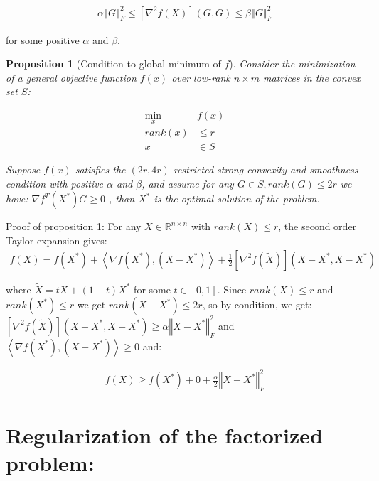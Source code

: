 \documentclass{article}
\newtheorem{proposition}{Proposition}
\begin{document}
\begin{align}
\alpha\left\Vert G\right\Vert^2_F\le \left[\nabla^2f\left(X\right)\right]\left(G,G\right)\le \beta\left\Vert G\right\Vert^2_F
\end{align}

for some positive $\alpha$ and $\beta$.

\begin{proposition}[Condition to global minimum of $f$]
Consider the minimization of a general objective function $f\left(x\right)$ over low-rank $n\times m$ matrices in the convex set $S$:

\begin{align*}
    \min_{x} & f\left(x\right)\\
    rank\left(x\right) & \le r\\
    x & \in S
\end{align*}

Suppose $f\left(x\right)$ satisfies the $\left(2r,4r\right)$-restricted strong convexity and smoothness condition with positive $\alpha$ and $\beta$, and assume for any $G\in S,rank\left(G\right)\le2r$ we have: $\nabla f^{T}\left(X^{*}\right)G\ge0$ , than $X^{*}$ is the optimal solution of the problem.

\end{proposition}

Proof of proposition 1: For any $X\in\mathbb{R}^{n\times n}$ with $rank\left(X\right)\le r$, the second order Taylor expansion gives:
\begin{align*}
    f\left(X\right)=f\left(X^{*}\right)+\left\langle \nabla f\left(X^{*}\right),\left(X-X^{*}\right)\right\rangle +\frac{1}{2}\left[\nabla^{2}f\left(\widetilde{X}\right)\right]\left(X-X^{*},X-X^{*}\right)
\end{align*}

where $\widetilde{X}=tX+\left(1-t\right)X^{*}$ for some $t\in\left[0,1\right]$. Since $rank\left(X\right)\le r$ and $rank\left(X^{*}\right)\le r$ we get $rank\left(X-X^{*}\right)\le2r$, so by condition, we get: $\left[\nabla^{2}f\left(\widetilde{X}\right)\right]\left(X-X^{*},X-X^{*}\right)\ge\alpha\left\Vert X-X^{*}\right\Vert _{F}^{2}$ and $\left\langle \nabla f\left(X^{*}\right),\left(X-X^{*}\right)\right\rangle \ge0$ and:

\begin{align*}
    f\left(X\right)\ge f\left(X^{*}\right)+0+\frac{\alpha}{2}\left\Vert X-X^{*}\right\Vert _{F}^{2}
\end{align*}


\section{Regularization of the factorized problem:}
\end{document}
